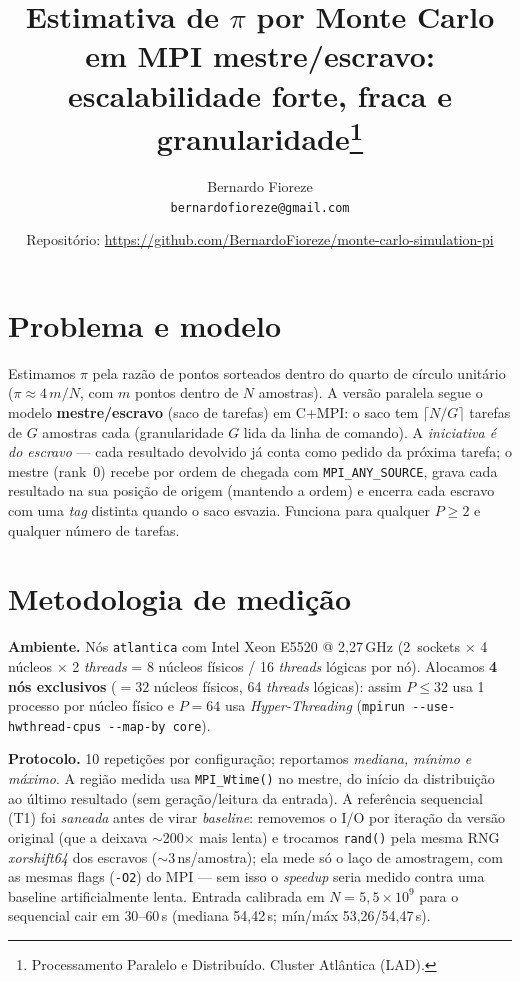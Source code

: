 \documentclass[10pt,twocolumn,a4paper]{article}
\title{\vspace{-1.2em}Estimativa de $\pi$ por Monte Carlo em MPI mestre/escravo:\\
escalabilidade forte, fraca e granularidade\thanks{Processamento Paralelo e Distribuído. %
Cluster Atlântica (LAD).}}
\author{Bernardo Fioreze %
\\ \texttt{bernardofioreze@gmail.com}}
\date{\footnotesize Repositório: \url{https://github.com/BernardoFioreze/monte-carlo-simulation-pi}}
\begin{document}
\maketitle
\thispagestyle{empty}

\section{Problema e modelo}
Estimamos $\pi$ pela razão de pontos sorteados dentro do quarto de círculo
unitário ($\pi \approx 4\,m/N$, com $m$ pontos dentro de $N$ amostras). A versão
paralela segue o modelo \textbf{mestre/escravo} (saco de tarefas) em C+MPI: o saco
tem $\lceil N/G\rceil$ tarefas de $G$ amostras cada (granularidade $G$ lida da linha
de comando). A \emph{iniciativa é do escravo} --- cada resultado devolvido já conta
como pedido da próxima tarefa; o mestre (rank~0) recebe por ordem de chegada com
\texttt{MPI\_ANY\_SOURCE}, grava cada resultado na sua posição de origem (mantendo a
ordem) e encerra cada escravo com uma \emph{tag} distinta quando o saco esvazia.
Funciona para qualquer $P\ge 2$ e qualquer número de tarefas.

\section{Metodologia de medição}
\textbf{Ambiente.} Nós \texttt{atlantica} com Intel Xeon E5520 @ 2,27\,GHz
(2~sockets $\times$ 4 núcleos $\times$ 2 \emph{threads} = 8 núcleos físicos / 16
\emph{threads} lógicas por nó). Alocamos \textbf{4 nós exclusivos} ($=32$ núcleos
físicos, 64 \emph{threads} lógicas): assim $P\le 32$ usa 1 processo por núcleo físico
e $P=64$ usa \emph{Hyper-Threading} (\texttt{mpirun -{}-use-hwthread-cpus -{}-map-by core}).

\textbf{Protocolo.} 10 repetições por configuração; reportamos
\emph{mediana, mínimo e máximo}. A região medida usa \texttt{MPI\_Wtime()} no mestre,
do início da distribuição ao último resultado (sem geração/leitura da entrada). A
referência sequencial (T1) foi \emph{saneada} antes de virar \emph{baseline}:
removemos o I/O por iteração da versão original (que a deixava $\sim$200$\times$ mais
lenta) e trocamos \texttt{rand()} pela mesma RNG \emph{xorshift64} dos escravos
($\sim$3\,ns/amostra); ela mede só o laço de amostragem, com as mesmas flags
(\texttt{-O2}) do MPI --- sem isso o \emph{speedup} seria medido contra uma baseline
artificialmente lenta. Entrada calibrada em $N=5{,}5\times10^{9}$ para o sequencial cair em
$30$--$60$\,s (mediana 54,42\,s; mín/máx 53,26/54,47\,s).
\end{document}

